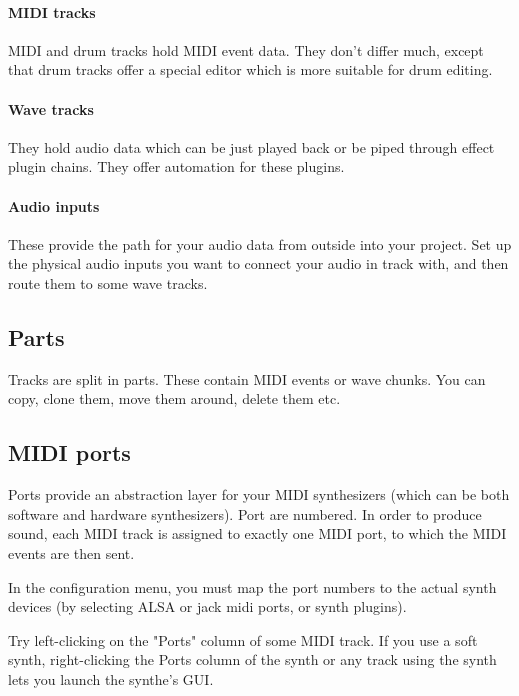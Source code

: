 \documentclass[a4paper]{report}
\begin{document}
\paragraph{MIDI tracks}
MIDI and drum tracks hold MIDI event data. They don't differ much,
except that drum tracks offer a special editor which is more suitable
for drum editing.

\paragraph{Wave tracks}
They hold audio data which can be just played back or be piped through
effect plugin chains. They offer automation for these plugins.

\paragraph{Audio inputs}
These provide the path for your audio data from outside into your
project. Set up the physical audio inputs you want to connect your audio
in track with, and then route them to some wave tracks.

                                                                         
\subsection{Parts}
Tracks are split in parts. These contain MIDI events or wave chunks.
You can copy, clone them, move them around, delete them etc.

\subsection{MIDI ports}
Ports provide an abstraction layer for your MIDI synthesizers (which
can be both software and hardware synthesizers). Port are numbered.
In order to produce sound, each MIDI track is assigned to exactly one
MIDI port, to which the MIDI events are then sent.

In the configuration menu, you must map the port numbers to the actual
synth devices (by selecting ALSA or jack midi ports, or synth plugins).

Try left-clicking on the "Ports" column of some MIDI track. If you
use a soft synth, right-clicking the Ports column of the synth or any
track using the synth lets you launch the synthe's GUI.
\end{document}
